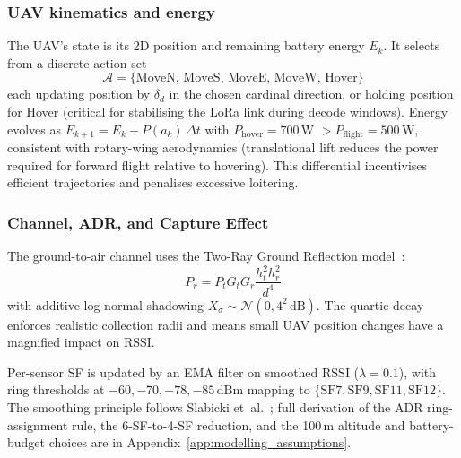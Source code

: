 \subsubsection{UAV kinematics and energy}

The UAV's state is its 2D position and remaining battery energy
$E_k$. It selects from a discrete action set
\begin{equation}
    \mathcal{A} = \{\mathrm{MoveN},\, \mathrm{MoveS},\,
                    \mathrm{MoveE},\, \mathrm{MoveW},\,
                    \mathrm{Hover}\}
    \label{eq:action_space}
\end{equation}
each updating position by $\delta_d$ in the chosen cardinal
direction, or holding position for Hover (critical for stabilising
the LoRa link during decode windows). Energy evolves as
$E_{k+1} = E_k - P(a_k)\,\Delta t$ with
$P_{\mathrm{hover}} = 700$\,W $> P_{\mathrm{flight}} = 500$\,W,
consistent with rotary-wing aerodynamics (translational lift reduces
the power required for forward flight relative to hovering). This
differential incentivises efficient trajectories and penalises
excessive loitering.

\subsubsection{Channel, ADR, and Capture Effect}

The ground-to-air channel uses the Two-Ray Ground Reflection
model~\cite{rappaport2002wireless}:
\begin{equation}
    P_r = P_t G_t G_r \frac{h_t^2 h_r^2}{d^4}
    \label{eq:tworay}
\end{equation}
with additive log-normal shadowing
$X_\sigma\sim\mathcal{N}(0, 4^2\,\mathrm{dB})$. The quartic decay
enforces realistic collection radii and means small UAV position
changes have a magnified impact on RSSI.

Per-sensor SF is updated by an EMA filter on smoothed RSSI
($\lambda = 0.1$), with ring thresholds at
$-60, -70, -78, -85$\,dBm mapping to
$\{\mathrm{SF}7, \mathrm{SF}9, \mathrm{SF}11, \mathrm{SF}12\}$. The
smoothing principle follows Slabicki et~al.~\cite{slabicki2018adaptive};
full derivation of the ADR ring-assignment rule, the 6-SF-to-4-SF
reduction, and the 100\,m altitude and battery-budget choices are in
Appendix~\ref{app:modelling_assumptions}.


